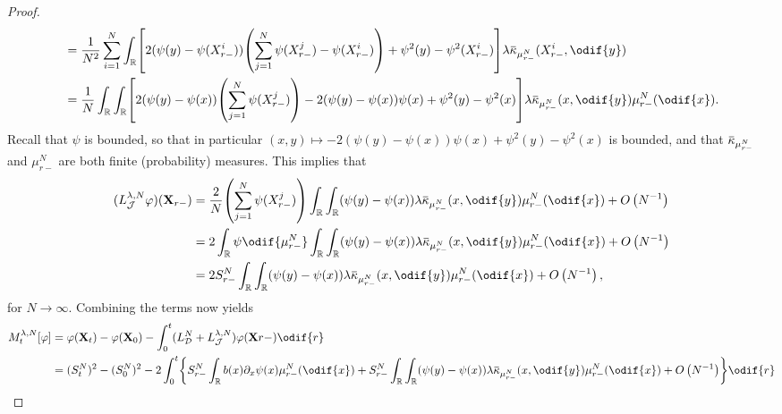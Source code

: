\begin{proof}
\begin{equation}
\begin{split}
       & = \frac{1}{N^2} \sum_{i=1}^N \int_\potspace \sbr*{ 2 (\psi(y) - \psi(X_{r-}^i)) \br*{\sum_{j=1}^N \psi(X_{r-}^j) - \psi(X_{r-}^i)} + \psi^2(y) - \psi^2(X_{r-}^i) } \lambda \ol{\kappa}_{\mu_{r-}^N}(X_{r-}^i, \odif{y})                      \\
       & = \frac{1}{N} \int_\potspace \int_\potspace \sbr*{ 2 (\psi(y) - \psi(x)) \br*{\sum_{j=1}^N \psi(X_{r-}^j)} - 2 (\psi(y) - \psi(x)) \psi(x) + \psi^2(y) - \psi^2(x) } \lambda \ol{\kappa}_{\mu_{r-}^N}(x, \odif{y}) \mu_{r-}^N(\odif{x}).
    \end{split}
  \end{equation}
  Recall that \( \psi \) is bounded, so that in particular \( (x,y) \mapsto - 2 (\psi(y) - \psi(x)) \psi(x) + \psi^2(y) - \psi^2(x) \) is bounded, and that \( \ol{\kappa}_{\mu_{r-}^N} \) and \( \mu_{r-}^N \) are both finite (probability) measures.
  This implies that
  \begin{equation}
    \begin{split}
      (L_{\cJ}^{\lambda, N} \varphi) (\bm{X}_{r-})
       & = \frac{2}{N} \br*{\sum_{j=1}^N \psi(X_{r-}^j)}  \int_\potspace \int_\potspace (\psi(y) - \psi(x)) \lambda \ol{\kappa}_{\mu_{r-}^N}(x, \odif{y}) \mu_{r-}^N(\odif{x}) + \bigO{N^{-1}} \\
       & = 2 \int_\potspace \psi \odif{\mu_{r-}^N} \int_\potspace \int_\potspace (\psi(y) - \psi(x)) \lambda \ol{\kappa}_{\mu_{r-}^N}(x, \odif{y}) \mu_{r-}^N(\odif{x})  + \bigO{N^{-1}}       \\
       & = 2 S_{r-}^N \int_\potspace \int_\potspace (\psi(y) - \psi(x)) \lambda \ol{\kappa}_{\mu_{r-}^N}(x, \odif{y}) \mu_{r-}^N(\odif{x})  + \bigO{N^{-1}},
    \end{split}
  \end{equation}
  for \( N \to \infty \).
  Combining the terms now yields
  \begin{equation}
    \begin{split}
      M_t^{\lambda, N}[\varphi]
                                         & = \varphi(\bm{X}_t) - \varphi(\bm{X}_0) - \int_0^t (L_{\cD}^{N} + L_{\cJ}^{\lambda, N}) \varphi (\bm{X}{r-}) \odif{r}                                                                                                                                                          \\
                                         & = (S_t^N)^2 - (S_0^N)^2 - 2 \int_0^t \cbr*{ S_{r-}^N \int_\potspace b(x) \partial_x \psi (x) \mu_{r-}^N(\odif{x}) + S_{r-}^N \int_\potspace \int_\potspace (\psi(y) - \psi(x)) \lambda \ol{\kappa}_{\mu_{r-}^N}(x, \odif{y}) \mu_{r-}^N(\odif{x})  + \bigO{N^{-1}} }  \odif{r} \\

\end{split}
\end{equation}
\end{proof}

